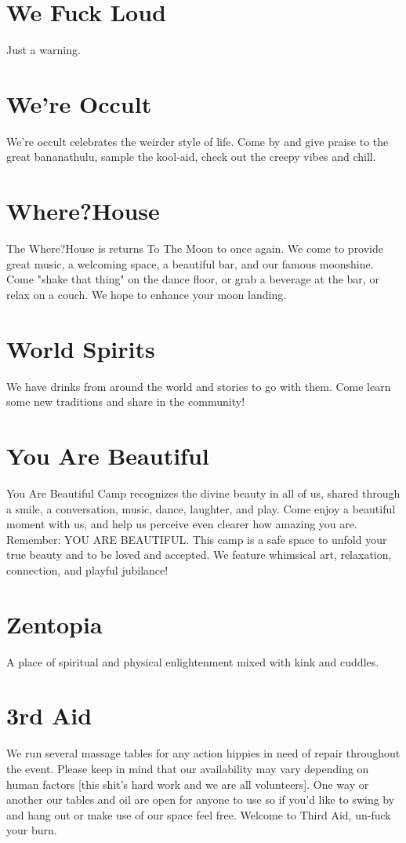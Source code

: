 \section*{We Fuck Loud}
Just a warning. 


\section*{We're Occult}
We're occult celebrates the weirder style of life. Come by and give praise to the great bananathulu, sample the kool-aid, check out the creepy vibes and chill. 


\section*{Where?House}
The Where?House is returns To The Moon to once again. We come to provide great music, a welcoming space, a beautiful bar, and our famous moonshine. Come "shake that thing" on the dance floor, or grab a beverage at the bar, or relax on a couch. We hope to enhance your moon landing.  


\section*{World Spirits}
We have drinks from around the world and stories to go with them. Come learn some new traditions and share in the community! 


\section*{You Are Beautiful}
You Are Beautiful Camp recognizes the divine beauty in all of us, shared through a smile, a conversation, music, dance, laughter, and play. Come enjoy a beautiful moment with us, and help us perceive even clearer how amazing you are. Remember: YOU ARE BEAUTIFUL. This camp is a safe space to unfold your true beauty and to be loved and accepted. We feature whimsical art, relaxation, connection, and playful jubilance! 


\section*{Zentopia}
A place of spiritual and physical enlightenment mixed with kink and cuddles. 


\section*{3rd Aid}
We run several massage tables for any action hippies in need of repair throughout the event. Please keep in mind that our availability may vary depending on human factors [this shit's hard work and we are all volunteers]. One way or another our tables and oil are open for anyone to use so if you'd like to swing by and hang out or make use of our space feel free. Welcome to Third Aid, un-fuck your burn. 





